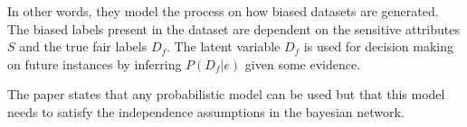 In other words, they model the process on how biased datasets are generated. The biased labels present in the dataset are dependent on the sensitive attributes $S$ and the true fair labels $D_f$. The latent variable $D_f$ is used for decision making on future instances by inferring $P(D_f|e)$ given some evidence.

The paper states that any probabilistic model can be used but that this model needs to satisfy the independence assumptions in the bayesian network.